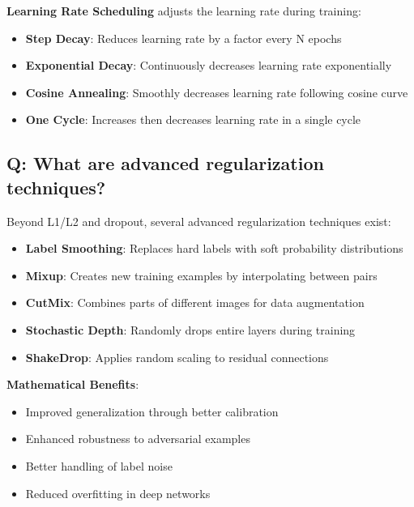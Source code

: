 \textbf{Learning Rate Scheduling} adjusts the learning rate during training:
\begin{itemize}
	\item \textbf{Step Decay}: Reduces learning rate by a factor every N epochs
	\item \textbf{Exponential Decay}: Continuously decreases learning rate exponentially
	\item \textbf{Cosine Annealing}: Smoothly decreases learning rate following cosine curve
	\item \textbf{One Cycle}: Increases then decreases learning rate in a single cycle
\end{itemize}

\subsection*{\textcolor{primaryteal}{Q: What are advanced regularization techniques?}}
Beyond L1/L2 and dropout, several advanced regularization techniques exist:

\begin{itemize}
	\item \textbf{Label Smoothing}: Replaces hard labels with soft probability distributions
	\item \textbf{Mixup}: Creates new training examples by interpolating between pairs
	\item \textbf{CutMix}: Combines parts of different images for data augmentation
	\item \textbf{Stochastic Depth}: Randomly drops entire layers during training
	\item \textbf{ShakeDrop}: Applies random scaling to residual connections
\end{itemize}

\textbf{Mathematical Benefits}:
\begin{itemize}
	\item Improved generalization through better calibration
	\item Enhanced robustness to adversarial examples
	\item Better handling of label noise
	\item Reduced overfitting in deep networks
\end{itemize}
